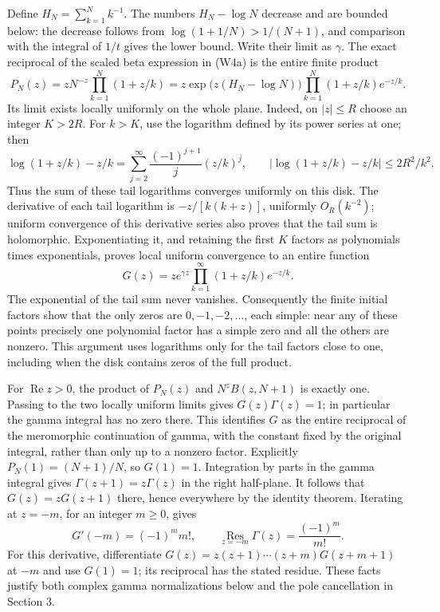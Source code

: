 \documentclass[
  11pt,
]{article}
\begin{document}
Define \(H_N=\sum_{k=1}^N k^{-1}\). The numbers \(H_N-\log N\) decrease
and are bounded below: the decrease follows from
\(\log(1+1/N)>1/(N+1)\), and comparison with the integral of \(1/t\)
gives the lower bound. Write their limit as \(\gamma\). The exact
reciprocal of the scaled beta expression in (W4a) is the entire finite
product \[
 P_N(z)=zN^{-z}\prod_{k=1}^N(1+z/k)
 =z\exp\bigl(z(H_N-\log N)\bigr)
       \prod_{k=1}^N(1+z/k)e^{-z/k}.
 \tag{W4b}
\] Its limit exists locally uniformly on the whole plane. Indeed, on
\(|z|\leq R\) choose an integer \(K>2R\). For \(k>K\), use the logarithm
defined by its power series at one; then \[
 \log(1+z/k)-z/k
 =\sum_{j=2}^{\infty}\frac{(-1)^{j+1}}{j}(z/k)^j,
 \qquad
 \bigl|\log(1+z/k)-z/k\bigr|\leq 2R^2/k^2.
 \tag{W4c}
\] Thus the sum of these tail logarithms converges uniformly on this
disk. The derivative of each tail logarithm is \(-z/[k(k+z)]\),
uniformly \(O_R(k^{-2})\); uniform convergence of this derivative series
also proves that the tail sum is holomorphic. Exponentiating it, and
retaining the first \(K\) factors as polynomials times exponentials,
proves local uniform convergence to an entire function \[
 G(z)=z e^{\gamma z}\prod_{k=1}^{\infty}(1+z/k)e^{-z/k}.
 \tag{W4d}
\] The exponential of the tail sum never vanishes. Consequently the
finite initial factors show that the only zeros are \(0,-1,-2,\ldots\),
each simple: near any of these points precisely one polynomial factor
has a simple zero and all the others are nonzero. This argument uses
logarithms only for the tail factors close to one, including when the
disk contains zeros of the full product.

For \(\operatorname{Re}z>0\), the product of \(P_N(z)\) and
\(N^zB(z,N+1)\) is exactly one. Passing to the two locally uniform
limits gives \(G(z)\Gamma(z)=1\); in particular the gamma integral has
no zero there. This identifies \(G\) as the entire reciprocal of the
meromorphic continuation of gamma, with the constant fixed by the
original integral, rather than only up to a nonzero factor. Explicitly
\(P_N(1)=(N+1)/N\), so \(G(1)=1\). Integration by parts in the gamma
integral gives \(\Gamma(z+1)=z\Gamma(z)\) in the right half-plane. It
follows that \(G(z)=zG(z+1)\) there, hence everywhere by the identity
theorem. Iterating at \(z=-m\), for an integer \(m\geq0\), gives \[
 G'(-m)=(-1)^m m!,\qquad
 \operatorname*{Res}_{z=-m}\Gamma(z)=\frac{(-1)^m}{m!}.
 \tag{W4e}
\] For this derivative, differentiate \(G(z)=z(z+1)\cdots(z+m)G(z+m+1)\)
at \(-m\) and use \(G(1)=1\); its reciprocal has the stated residue.
These facts justify both complex gamma normalizations below and the pole
cancellation in Section 3.
\end{document}
